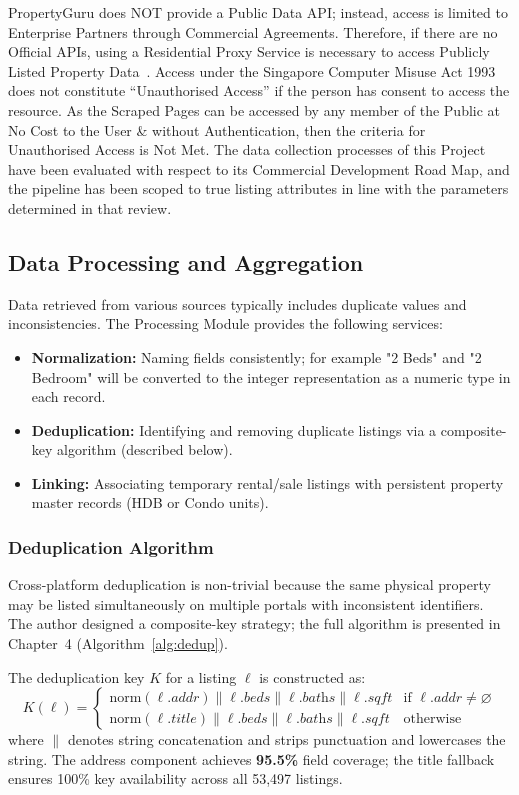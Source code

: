 PropertyGuru does NOT provide a Public Data API; instead, access is limited to 
Enterprise Partners through Commercial Agreements. Therefore, if there are no 
Official APIs, using a Residential Proxy Service is necessary to access 
Publicly Listed Property Data~\cite{landers2016inconvenient}. Access under the 
Singapore Computer Misuse Act 1993 does not constitute ``Unauthorised Access'' 
if the person has consent to access the resource. As the Scraped Pages can be 
accessed by any member of the Public at No Cost to the User \& without 
Authentication, then the criteria for Unauthorised Access is Not Met. The data 
collection processes of this Project have been evaluated with respect to its 
Commercial Development Road Map, and the pipeline has been scoped to true 
listing attributes in line with the parameters determined in that review.


\subsection{Data Processing and Aggregation}
Data retrieved from various sources typically includes duplicate values and inconsistencies. The Processing Module provides the following services:
\begin{itemize}
    \item \textbf{Normalization:} Naming fields consistently; for example "2 Beds" and "2 Bedroom" will be converted to the integer representation as a numeric type in each record.
    \item \textbf{Deduplication:} Identifying and removing duplicate listings via a composite-key algorithm (described below).
    \item \textbf{Linking:} Associating temporary rental/sale listings with persistent property master records (HDB or Condo units).
\end{itemize}

\subsubsection{Deduplication Algorithm}

Cross-platform deduplication is non-trivial because the same physical property may be listed simultaneously on multiple portals with inconsistent identifiers. The author designed a composite-key strategy; the full algorithm is presented in Chapter~4 (Algorithm~\ref{alg:dedup}).

The deduplication key $K$ for a listing $\ell$ is constructed as:
\[
K(\ell) =
\begin{cases}
\text{norm}(\ell.\textit{addr}) \| \ell.\textit{beds} \| \ell.\textit{baths} \| \ell.\textit{sqft} & \text{if } \ell.\textit{addr} \neq \varnothing \\[4pt]
\text{norm}(\ell.\textit{title}) \| \ell.\textit{beds} \| \ell.\textit{baths} \| \ell.\textit{sqft} & \text{otherwise}
\end{cases}
\]
where $\|$ denotes string concatenation and  strips punctuation and lowercases the string. The address component achieves \textbf{95.5\%} field coverage; the title fallback ensures 100\% key availability across all 53,497 listings.

